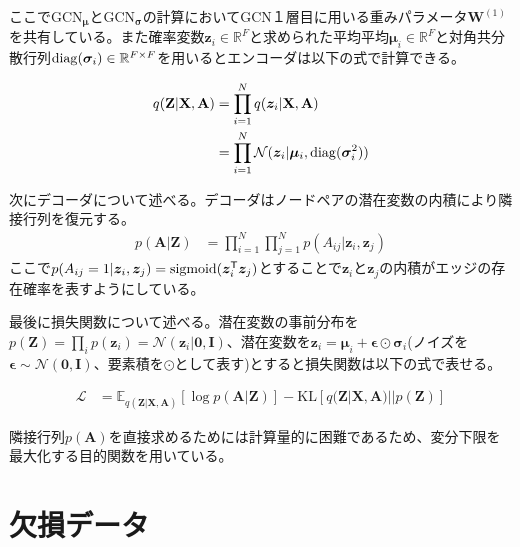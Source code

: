 ここで$\mathrm{GCN}_{\boldsymbol{\mu}}$と$\mathrm{GCN}_{\boldsymbol{\sigma}}$の計算においてGCN１層目に用いる重みパラメータ$\mathbf{W}^{(1)}$を共有している。また確率変数$\boldsymbol{z}_i \in \mathbb{R}^{F}$と求められた平均平均$\boldsymbol{\mu}_i \in \mathbb{R}^{F}$と対角共分散行列$\mathrm{diag}(\boldsymbol{\sigma}_i) \in \mathbb{R}^{F \times F}$を用いるとエンコーダは以下の式で計算できる。

\begin{align}
  q(\mathbf{Z} | \mathbf{X}, \mathbf{A}) &= \prod_{i=1}^N q(\boldsymbol{z}_i | \mathbf{X}, \mathbf{A})\\
  &= \prod_{i=1}^N \mathcal{N} (\boldsymbol{z}_i | \boldsymbol{\mu}_i, \mathrm{diag}(\boldsymbol{\sigma}_i^2)) \label{eq:vgae_encoder_output}
\end{align}




次にデコーダについて述べる。デコーダはノードペアの潜在変数の内積により隣接行列を復元する。
\begin{align}
    p(\mathbf{A} | \mathbf{Z}) &= \prod_{i=1}^N \prod_{j=1}^N p(A_{ij} | \boldsymbol{z}_i, \boldsymbol{z}_j)
\end{align}
ここで$p(A_{ij} = 1 | \boldsymbol{z}_i, \boldsymbol{z}_j) = \mathrm{sigmoid}(\boldsymbol{z}_i^{\mathsf{T}} \boldsymbol{z}_j)$とすることで$\boldsymbol{z}_i$と$\boldsymbol{z}_j$の内積がエッジの存在確率を表すようにしている。

最後に損失関数について述べる。潜在変数の事前分布を$p(\mathbf{Z}) = \prod_i p(\boldsymbol{z}_i) = \mathcal{N}(\boldsymbol{z}_i | \boldsymbol{0}, \mathbf{I})$、潜在変数を$\boldsymbol{z}_i = \boldsymbol{\mu}_i + \boldsymbol{\epsilon}\odot \boldsymbol{\sigma}_i$(ノイズを$\boldsymbol{\epsilon} \sim \mathcal{N}(\boldsymbol{0}, \mathbf{I})$、要素積を$\odot$として表す)とすると損失関数は以下の式で表せる。

\begin{align}
    \mathcal{L} &= \mathbb{E}_{q(\mathbf{Z} | \mathbf{X}, \mathbf{A})}[\log p(\mathbf{A} | \mathbf{Z})] - \mathrm{KL}[q(\mathbf{Z} | \mathbf{X}, \mathbf{A}) || p(\mathbf{Z})]
\end{align}

隣接行列$p(\mathbf{A})$を直接求めるためには計算量的に困難であるため、変分下限を最大化する目的関数を用いている。


\section{欠損データ}
